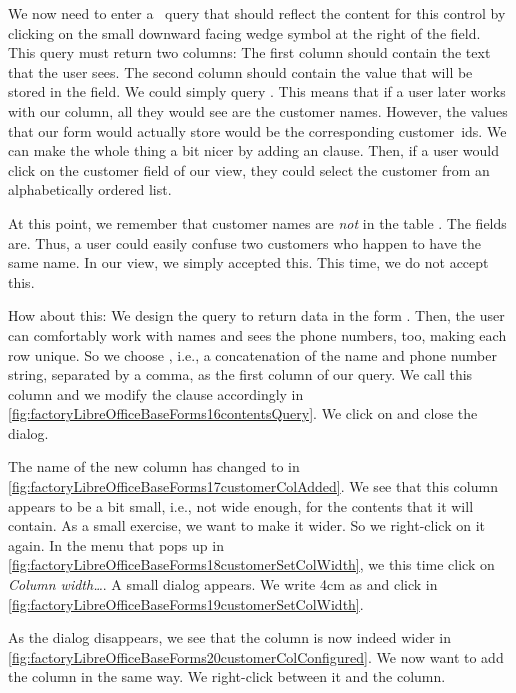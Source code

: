 We now need to enter a \sql\ query that should reflect the content for this control by clicking on the small downward facing wedge symbol at the right of the  field.
This query must return two columns:
The first column should contain the text that the user sees.
The second column should contain the value that will be stored in the  field.
We could simply query .
This means that if a user later works with our column, all they would see are the customer names.
However, the values that our form would actually store would be the corresponding customer~ids.
We can make the whole thing a bit nicer by adding an  clause.
Then, if a user would click on the customer field of our view, they could select the customer from an alphabetically ordered list.

At this point, we remember that customer names are \emph{not}  in the table .
The  fields are.
Thus, a user could easily confuse two customers who happen to have the same name.
In our  view, we simply accepted this.
This time, we do not accept this.

How about this:
We design the query to return data in the form .
Then, the user can comfortably work with names and sees the phone numbers, too, making each row unique.
So we choose \sqlIdx{\textbar\textbar}, i.e., a concatenation of the name and phone number string, separated by a comma, as the first column of our query.
We call this column  and we modify the  clause accordingly in \cref{fig:factoryLibreOfficeBaseForms16contentsQuery}.
We click on  and close the dialog.

The name of the new column has changed to  in \cref{fig:factoryLibreOfficeBaseForms17customerColAdded}.
We see that this column appears to be a bit small, i.e., not wide enough, for the contents that it will contain.
As a small exercise, we want to make it wider.
So we right-click on it again.
In the menu that pops up in \cref{fig:factoryLibreOfficeBaseForms18customerSetColWidth}, we this time click on \emph{Column width\dots}.
A small dialog appears.
We write 4cm as  and click  in \cref{fig:factoryLibreOfficeBaseForms19customerSetColWidth}.

As the dialog disappears, we see that the column is now indeed wider in \cref{fig:factoryLibreOfficeBaseForms20customerColConfigured}.
We now want to add the  column in the same way.
We right-click between it and the  column.

